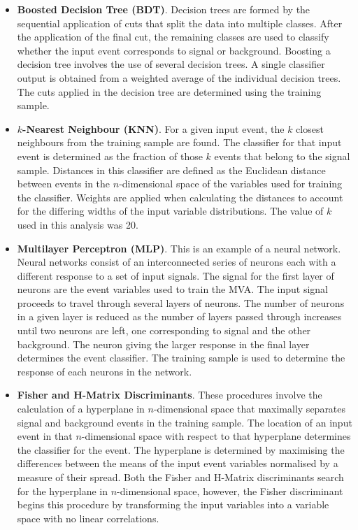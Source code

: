 \begin{itemize}
\item \textbf{Boosted Decision Tree (BDT)}.  Decision trees are formed by the sequential application of cuts that split the data into multiple classes.  After the application of the final cut, the remaining classes are used to classify whether the input event corresponds to signal or background.  Boosting a decision tree involves the use of several decision trees.  A single classifier output is obtained from a weighted average of the individual decision trees.  The cuts applied in the decision tree are determined using the training sample.  
\item \textbf{$k$-Nearest Neighbour (KNN)}.  For a given input event, the $k$ closest neighbours from the training sample are found.  The classifier for that input event is determined as the fraction of those $k$ events that belong to the signal sample.  Distances in this classifier are defined as the Euclidean distance between events in the $n$-dimensional space of the variables used for training the classifier.  Weights are applied when calculating the distances to account for the differing widths of the input variable distributions.  The value of $k$ used in this analysis was 20.
\item \textbf{Multilayer Perceptron (MLP)}.  This is an example of a {neural} network.  {Neural} networks consist of an interconnected series of neurons each with a different response to a set of input signals.  The signal for the first layer of neurons are the event variables used to train the MVA.  The input signal proceeds to travel through several layers of neurons.  The number of neurons in a given layer is reduced as the number of layers passed through increases until two neurons are left, one corresponding to signal and the other background.  The neuron giving the larger response in the final layer determines the event classifier.  The training sample is used to determine the response of each neurons in the network.
\item \textbf{Fisher and H-Matrix Discriminants}.  These procedures involve the calculation of a hyperplane in $n$-dimensional space that maximally separates signal and background events in the training sample.  The location of an input event in that $n$-dimensional space with respect to that hyperplane determines the classifier for the event.  The hyperplane is determined by maximising the differences between the means of the input event variables normalised by a measure of their spread.  Both the Fisher and H-Matrix discriminants search for the hyperplane in $n$-dimensional space, however, the Fisher discriminant begins this procedure by transforming the input variables into a variable space with no linear correlations.  

\end{itemize}
